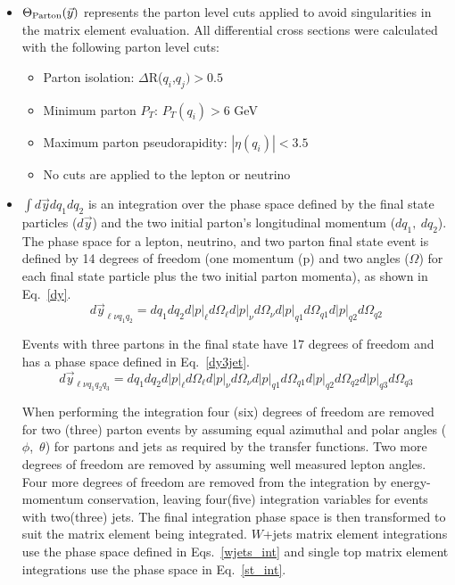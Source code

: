\begin{itemize}
\begin{itemize}
\end{itemize}

\item $\Theta_{\rm{Parton}}(\vec{y})$ represents the parton level
cuts applied to avoid singularities in the matrix element
evaluation. All differential cross sections were calculated with the
following parton level cuts:

\begin{itemize}
\item Parton isolation: $\Delta$R($q_{i}$,$q_{j})>0.5$
\item Minimum parton $P_T$: $P_{T}(q_i)>6$ GeV
\item Maximum parton pseudorapidity: $|\eta(q_i)|<3.5$
\item No cuts are applied to the lepton or neutrino
\end{itemize}

\item $\int d\vec{y}dq_{1}dq_{2}$ is an integration over the phase space defined by the final state particles ($d\vec{y}$) and the two initial parton's longitudinal momentum ($dq_{1},~dq_{2}$). The phase space for a lepton, neutrino, and two parton final state event is defined by 14 degrees of freedom (one momentum (p) and two angles ($\Omega$) for each final state particle plus the two initial parton momenta), as shown in Eq.~\ref{dy}.
\begin{equation}
\label{dy}
d\vec{y}_{\ell\nu q_{1}q_{2}} = dq_{1}dq_{2}d|p|_{\ell}
d\Omega_{\ell}d|p|_{\nu}
d\Omega_{\nu}d|p|_{q1}
d\Omega_{q1}d|p|_{q2}
d\Omega_{q2}
\end{equation}

Events with three partons in the final state have 17 degrees of freedom and has a phase space defined in Eq.~\ref{dy3jet}.
\begin{equation}
\label{dy3jet}
d\vec{y}_{\ell\nu q_{1}q_{2}q_{3}} = dq_{1}dq_{2}d|p|_{\ell}
d\Omega_{\ell}d|p|_{\nu}
d\Omega_{\nu}d|p|_{q1}
d\Omega_{q1}d|p|_{q2}
d\Omega_{q2}d|p|_{q3}
d\Omega_{q3}
\end{equation}

When performing the integration four (six) degrees of freedom are removed for two
(three) parton events by assuming equal azimuthal and polar angles ($\phi$,~$\theta$) for partons and
jets as required by the transfer functions. Two more
degrees of freedom are removed by assuming well measured lepton
angles. Four more degrees of freedom are removed from the integration
by energy-momentum conservation, leaving four(five) integration
variables for events with two(three) jets. The final integration phase space is then transformed to
suit the matrix element being integrated. $W$+jets matrix element
integrations use the phase space defined in Eqs.~\ref{wjets_int} and
single top matrix element integrations use the phase space in
Eq.~\ref{st_int}.


\end{itemize}
